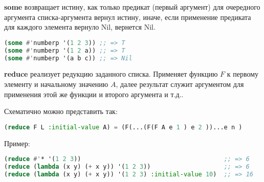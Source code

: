 \documentclass[a4paper,oneside,12pt]{extreport}
\begin{document}
\textbf{some} возвращает истину, как только предикат (первый аргумент) для очередного аргумента списка-аргумента вернул истину, 
иначе, если применение предиката для каждого элемента вернуло Nil, вернется Nil.

\begin{lstlisting}[language=Lisp] 
(some #'numberp '(1 2 3)) ;; => T
(some #'numberp '(1 2 a)) ;; => T
(some #'numberp '(a b c)) ;; => Nil
\end{lstlisting}

\textbf{reduce} реализует редукцию заданного списка.
Применяет функцию $F$ к первому элементу и начальному значению $A$, 
далее результат служит аргументом для применения этой же функции и второго аргумента и т.д..

Схематично можно представить так:
\begin{lstlisting}[language=Lisp] 
    (reduce F L :initial-value A) = (F(...(F(F A e 1 ) e 2 ))...e n )
\end{lstlisting}

Пример:
\begin{lstlisting}[language=Lisp] 
(reduce #'* '(1 2 3))                                       ;; => 6
(reduce (lambda (x y) (+ x y)) '(1 2 3))                    ;; => 6
(reduce (lambda (x y) (+ x y)) '(1 2 3) :initial-value 10)  ;; => 16
\end{lstlisting}
\end{document}

